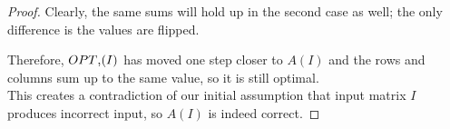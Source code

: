 \documentclass{article}
\begin{document}
\begin{proof}
	Clearly, the same sums will hold up in the second case as well; the only difference is the values are flipped.
	
	Therefore, $OPT\textsc{\char13}(I)$ has moved one step closer to $A(I)$ and the rows and columns sum up to the same value, so it is still optimal. \\
	
	This creates a contradiction of our initial assumption that input matrix $I$ produces incorrect input, so $A(I)$ is
	indeed correct.
	\end{proof}
\end{document}
